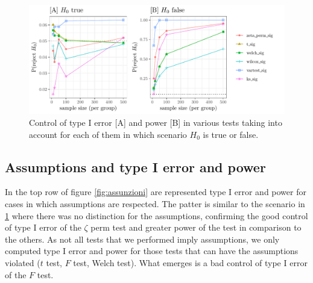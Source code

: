 \documentclass[10pt]{article}\usepackage[]{graphicx}\usepackage[]{xcolor}
\makeatletter
\def\maxwidth{ %
  \ifdim\Gin@nat@width>\linewidth
    \linewidth
  \else
    \Gin@nat@width
  \fi
}
\newenvironment{knitrout}{}{} %
\makeatother
\begin{document}
\begin{knitrout}
\color{fgcolor}\begin{figure}

{\centering \includegraphics[width=\maxwidth]{figure/global-1} 

}

\caption[l]{Control of type I error [A] and power [B] in various tests taking into account for each of them in which scenario $H_0$ is true or false.}\label{fig:global}
\end{figure}

\end{knitrout}

\subsection{Assumptions and type I error and power}

In the top row of figure \ref{fig:assunzioni} are represented type I error and power for cases in which assumptions are respected. The patter is similar to the scenario in \ref{fig:global} where there was no distinction for the assumptions, confirming the good control of type I error of the $\zeta$ perm test and greater power of the test in comparison to the others.
As not all tests that we performed imply assumptions, we only computed type I error and power for those tests that can have the assumptions violated ($t$ test, $F$ test, Welch test). What emerges is a bad control of type I error of the $F$ test.
\end{document}
